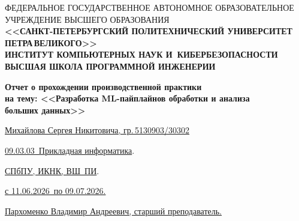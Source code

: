 
\thispagestyle{empty}

{\centering\small
  \MakeUppercase{Федеральное государственное автономное образовательное
    учреждение высшего образования}\\[2pt]
  {\bfseries
    <<\MakeUppercase{Санкт-Петербургский политехнический университет
      Петра\,Великого}>>\\[2pt]
    \MakeUppercase{Институт компьютерных наук и~кибербезопасности}\\[2pt]
    \MakeUppercase{Высшая школа программной инженерии}
  }
\par}

\vspace{0pt plus1fill}

{\centering\bfseries
  Отчет о прохождении производственной практики\\[4pt]
  на тему: <<Разработка ML-пайплайнов обработки и анализа\\
  больших данных>>
\par}

\bigskip

{\centering\normalfont
  \uline{Михайлова Сергея Никитовича, гр.\,5130903/30302} %
\par}

\bigskip

\uline{09.03.03~Прикладная информатика}.\par\smallskip

\uline{СПбПУ, ИКНК, ВШ~ПИ}.\par\smallskip

\uline{с 11.06.2026~по 09.07.2026.}\par\smallskip %

\uline{Пархоменко Владимир Андреевич, старший преподаватель.}\par\smallskip

 \uline{\hspace*{0.15\textheight}}

